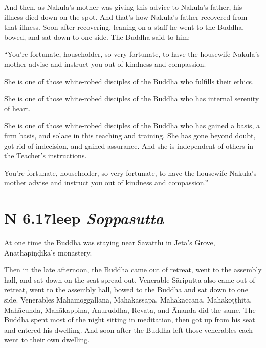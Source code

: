 \documentclass[12pt,openany]{book}%
\newcommand*{\suttatitleacronym}[1]{\smaller[2]{#1}\vspace*{.3em}}
\newcommand*{\suttatitletranslation}[1]{\linebreak{#1}}
\newcommand*{\suttatitleroot}[1]{\linebreak\smaller[2]\itshape{#1}}
\newcommand*{\tocacronym}[1]{\hspace*{-3.3em}{#1}\quad}
\newcommand*{\toctranslation}[1]{#1}
\newcommand*{\tocroot}[1]{(\textit{#1})}
\begin{document}
And then, as Nakula’s mother was giving this advice to Nakula’s father, his illness died down on the spot. And that’s how Nakula’s father recovered from that illness. Soon after recovering, leaning on a staff he went to the Buddha, bowed, and sat down to one side. The Buddha said to him: 

“You’re fortunate, householder, so very fortunate, to have the housewife Nakula’s mother advise and instruct you out of kindness and compassion. 

She is one of those white-robed disciples of the Buddha who fulfills their ethics. 

She is one of those white-robed disciples of the Buddha who has internal serenity of heart. 

She is one of those white-robed disciples of the Buddha who has gained a basis, a firm basis, and solace in this teaching and training. She has gone beyond doubt, got rid of indecision, and gained assurance. And she is independent of others in the Teacher’s instructions. 

You’re fortunate, householder, so very fortunate, to have the housewife Nakula’s mother advise and instruct you out of kindness and compassion.” 

%
\section*{{\suttatitleacronym AN 6.17}{\suttatitletranslation Sleep }{\suttatitleroot Soppasutta}}
\addcontentsline{toc}{section}{\tocacronym{AN 6.17} \toctranslation{Sleep } \tocroot{Soppasutta}}

At one time the Buddha was staying near \textsanskrit{Sāvatthī} in Jeta’s Grove, \textsanskrit{Anāthapiṇḍika}’s monastery. 

Then in the late afternoon, the Buddha came out of retreat, went to the assembly hall, and sat down on the seat spread out. Venerable \textsanskrit{Sāriputta} also came out of retreat, went to the assembly hall, bowed to the Buddha and sat down to one side. Venerables \textsanskrit{Mahāmoggallāna}, \textsanskrit{Mahākassapa}, \textsanskrit{Mahākaccāna}, \textsanskrit{Mahākoṭṭhita}, \textsanskrit{Mahācunda}, \textsanskrit{Mahākappina}, Anuruddha, Revata, and Ānanda did the same. The Buddha spent most of the night sitting in meditation, then got up from his seat and entered his dwelling. And soon after the Buddha left those venerables each went to their own dwelling. 
\end{document}
